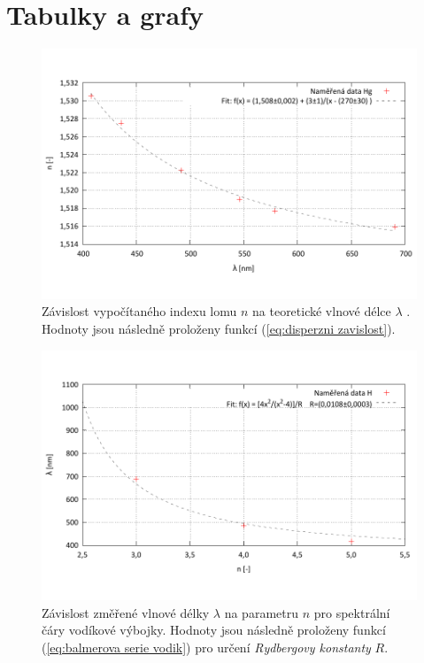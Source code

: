 \documentclass[english]{article}
\begin{document}
\section{Tabulky a grafy}



	\begin{figure}[h!]
	\begin{center}
	    \vspace*{-1cm}
		\includegraphics[width=\linewidth]{../gnuplot/hg.pdf}
	    \vspace*{-2cm}
		\caption{Závislost vypočítaného indexu lomu $n$ na teoretické vlnové délce $\lambda$ \cite{bib:na_miste}. Hodnoty jsou následně proloženy funkcí (\ref{eq:disperzni zavislost}). }
		\label{fig:g_hg}
	\end{center}
	\end{figure}
	
	\begin{figure}[h!]
	\begin{center}
	    \vspace*{-1cm}
		\includegraphics[width=\linewidth]{../gnuplot/r.pdf}
	    \vspace*{-2cm}
		\caption{Závislost změřené vlnové délky $\lambda$ na parametru $n$ pro spektrální čáry vodíkové výbojky. Hodnoty jsou následně proloženy funkcí (\ref{eq:balmerova serie vodik}) pro určení \emph{Rydbergovy konstanty} $R$. }
		\label{fig:g_r}
	\end{center}
	\end{figure}	
				
\end{document}
